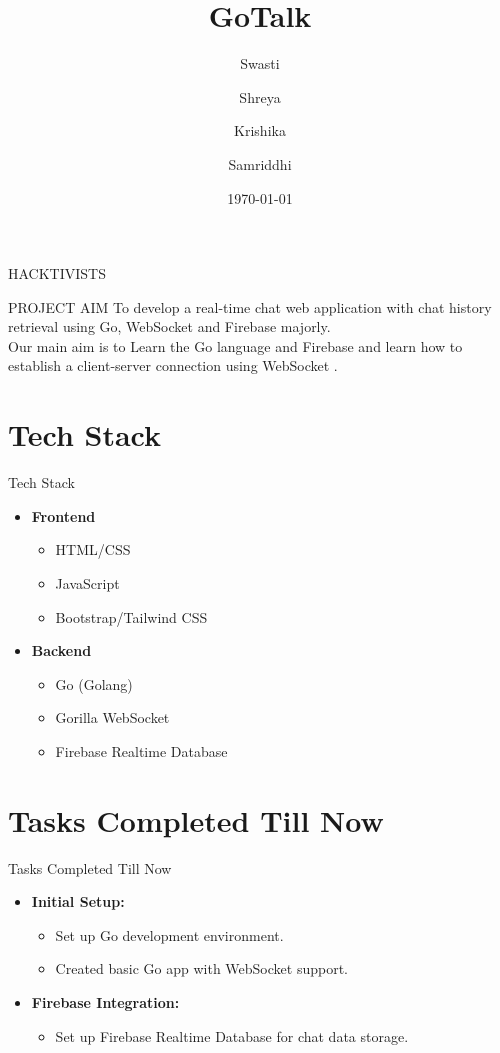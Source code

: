 \documentclass{beamer}
\title{GoTalk}
\author{Swasti \and Shreya \and Krishika \and Samriddhi}
\date{\today}
\begin{document}
\begin{frame}
    \titlepage
    \centering HACKTIVISTS
\end{frame}

\begin{frame}{PROJECT AIM}
    To develop a real-time chat web application with chat history retrieval using Go, WebSocket and Firebase majorly.   
    \\
    Our main aim is to Learn the Go language and Firebase and learn how to establish a client-server connection using WebSocket .
\end{frame}

\section{Tech Stack}
\begin{frame}{Tech Stack}
    \begin{itemize}
        \item \textbf{Frontend}
        \begin{itemize}
            \item HTML/CSS
            \item JavaScript
            \item Bootstrap/Tailwind CSS
        \end{itemize}
        \item \textbf{Backend}
        \begin{itemize}
            \item Go (Golang)
            \item Gorilla WebSocket
            \item Firebase Realtime Database
        \end{itemize}
    \end{itemize}
\end{frame}

\section{Tasks Completed Till Now}

\begin{frame}{Tasks Completed Till Now}
    \begin{itemize}
        \item \textbf{Initial Setup:}
        \begin{itemize}
            \item Set up Go development environment.
            \item Created basic Go app with WebSocket support.
        \end{itemize}
        \item \textbf{Firebase Integration:}
        \begin{itemize}
            \item Set up Firebase Realtime Database for chat data storage.
        \end{itemize}
    \end{itemize}
\end{frame}
\end{document}
